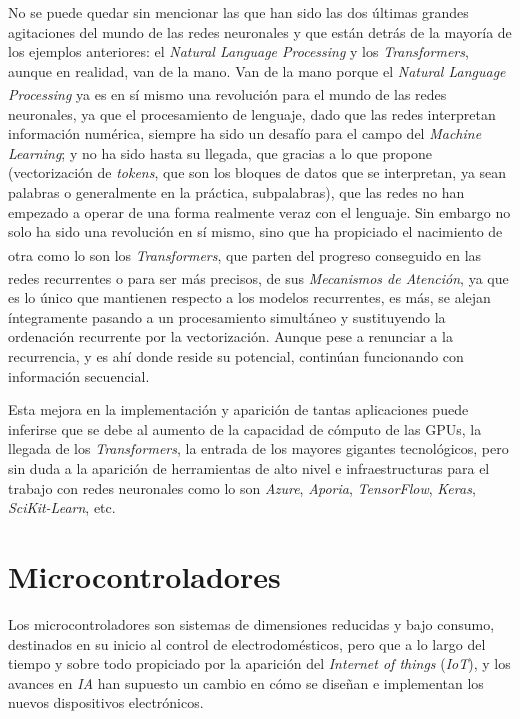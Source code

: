 No se puede quedar sin mencionar las que han sido las dos últimas grandes
agitaciones del mundo de las redes neuronales y que están detrás de la
mayoría de los ejemplos anteriores: el \textit{Natural Language Processing}
y los \textit{Transformers}, aunque en realidad, van de la mano.
Van de la mano porque el \textit{Natural Language Processing}\textsuperscript{\cite{nlp}}
ya es
en sí mismo una revolución para el mundo de las redes neuronales, ya que
el procesamiento de lenguaje, dado que las redes interpretan información
numérica, siempre ha sido un desafío para el campo del \textit{Machine Learning};
y no ha sido hasta su llegada, que gracias a lo que propone (vectorización de
\textit{tokens}, que son los bloques de datos que se interpretan, ya sean
palabras o generalmente en la práctica, subpalabras), que las redes
no han empezado a operar de una forma realmente veraz con el lenguaje.
Sin embargo no solo ha sido una revolución en sí mismo, sino que ha
propiciado el nacimiento de otra como lo son los \textit{Transformers}\textsuperscript{\cite{transformers}},
que parten del progreso conseguido en las redes recurrentes o para ser más
precisos, de sus \textit{Mecanismos de Atención}\textsuperscript{\cite{aiayn}},
ya que es lo único que
mantienen respecto a los modelos recurrentes, es más, se alejan íntegramente
pasando a un procesamiento simultáneo y sustituyendo la ordenación recurrente
por la vectorización. Aunque pese a renunciar a la recurrencia, y es ahí donde
reside su potencial, continúan funcionando con información secuencial.

Esta mejora en la implementación y aparición de tantas aplicaciones
puede inferirse que se debe al aumento de la capacidad de cómputo de
las GPUs, la llegada de los \textit{Transformers},
la entrada de los mayores gigantes tecnológicos, pero sin
duda a la aparición de herramientas de alto nivel e infraestructuras
para el trabajo con redes neuronales como lo son \textit{Azure},
\textit{Aporia}, \textit{TensorFlow}, \textit{Keras}, \textit{SciKit-Learn},
etc.

\section{Microcontroladores}
Los microcontroladores son sistemas de dimensiones reducidas y bajo consumo,
destinados en su inicio al control de electrodomésticos, pero que a lo largo
del tiempo y sobre todo propiciado por la aparición del
\textit{Internet of things} (\textit{IoT}), y los avances en \textit{IA} han
supuesto un cambio en cómo se diseñan e implementan los nuevos dispositivos
electrónicos.

